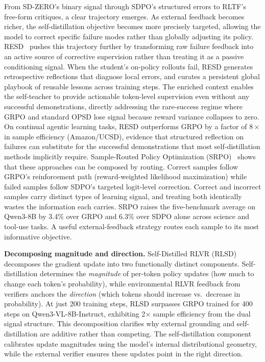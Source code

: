 \documentclass{article} %
\begin{document}
From SD-ZERO's binary signal through SDPO's structured errors to RLTF's free-form critiques, a clear trajectory emerges. As external feedback becomes richer, the self-distillation objective becomes more precisely targeted, allowing the model to correct specific failure modes rather than globally adjusting its policy. RESD~\citep{2605.12741} pushes this trajectory further by transforming raw failure feedback into an active source of corrective supervision rather than treating it as a passive conditioning signal. When the student's on-policy rollouts fail, RESD generates retrospective reflections that diagnose local errors, and curates a persistent global playbook of reusable lessons across training steps. The enriched context enables the self-teacher to provide actionable token-level supervision even without any successful demonstrations, directly addressing the rare-success regime where GRPO and standard OPSD lose signal because reward variance collapses to zero. On continual agentic learning tasks, RESD outperforms GRPO by a factor of $8\times$ in sample efficiency (Amazon/UCSD), evidence that structured reflection on failures can substitute for the successful demonstrations that most self-distillation methods implicitly require. Sample-Routed Policy Optimization (SRPO)~\citep{2604.02288} shows that these approaches can be composed by routing. Correct samples follow GRPO's reinforcement path (reward-weighted likelihood maximization) while failed samples follow SDPO's targeted logit-level correction. Correct and incorrect samples carry distinct types of learning signal, and treating both identically wastes the information each carries. SRPO raises the five-benchmark average on Qwen3-8B by 3.4\% over GRPO and 6.3\% over SDPO alone across science and tool-use tasks. A useful external-feedback strategy routes each sample to its most informative objective.

\textbf{Decomposing magnitude and direction.} Self-Distilled RLVR (RLSD)~\citep{2604.03128} decomposes the gradient update into two functionally distinct components. Self-distillation determines the \emph{magnitude} of per-token policy updates (how much to change each token's probability), while environmental RLVR feedback from verifiers anchors the \emph{direction} (which tokens should increase vs.\ decrease in probability). At just 200 training steps, RLSD surpasses GRPO trained for 400 steps on Qwen3-VL-8B-Instruct, exhibiting 2$\times$ sample efficiency from the dual signal structure. This decomposition clarifies why external grounding and self-distillation are additive rather than competing. The self-distillation component calibrates update magnitudes using the model's internal distributional geometry, while the external verifier ensures these updates point in the right direction.
\end{document}
